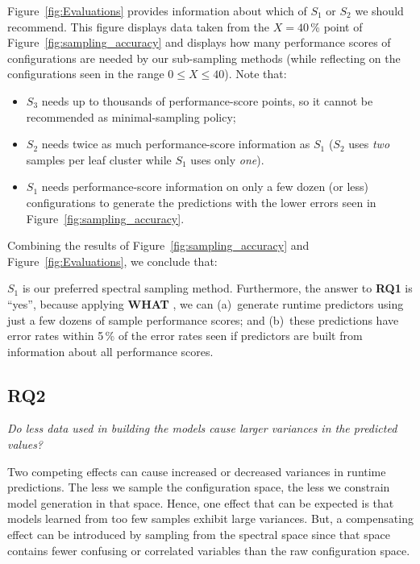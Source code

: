 \documentclass{newsig}
\newcommand{\fig}[1]{Figure~\ref{fig:#1}}
\newcommand{\what}{{\bf WHAT }}
\begin{document}
\fig{Evaluations} provides information about which  of    $S_1$ or $S_2$ we should recommend.
This figure displays data taken from the $X=40$\,\% point of \fig{sampling_accuracy} and displays
how many performance scores of configurations are needed by our sub-sampling methods (while
reflecting on the configurations seen in the range $0\le X \le 40$). Note that:
\begin{itemize}
\item
$S_3$ needs up to thousands of performance-score points, 
so it cannot be recommended as minimal-sampling policy;
\item $S_2$ needs twice as much performance-score information as 
$S_1$ ($S_2$ uses {\em two} samples per leaf cluster  while
$S_1$ uses only {\em one}).
\item $S_1$ needs performance-score information on only a few dozen (or less) configurations to generate
the predictions with the lower errors seen in \fig{sampling_accuracy}.
\end{itemize}
Combining the results of \fig{sampling_accuracy} and \fig{Evaluations}, we conclude that:

\begin{myshadowbox}
$S_1$ is our preferred spectral sampling method. Furthermore,
the answer to {\bf RQ1} is ``yes'', because applying \what{}, we can (a)~generate runtime predictors
using just a few dozens of sample performance scores; 
and (b)~these predictions have error rates
within 5\,\% of the error rates seen if predictors are built from information about all performance scores.
\end{myshadowbox}




\subsection{RQ2}

\begin{center}
{\em
Do less data used in building the models cause larger variances in the predicted values?}
\end{center}


Two competing effects can cause increased or decreased  variances in 
runtime predictions.
The   less we sample the configuration space,
the less we constrain model generation in that space. Hence, one effect that can be expected
is that models learned
from too few samples exhibit large variances. 
But,
a  compensating effect can be introduced by sampling from the spectral space
since that space contains fewer confusing or correlated variables than the raw configuration space.
\end{document}
